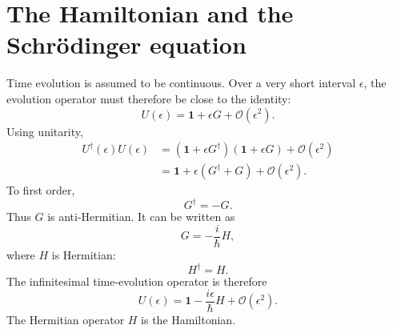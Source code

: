 \begin{classroomqa}
\end{classroomqa}

\section{The Hamiltonian and the Schr\"odinger equation}

Time evolution is assumed to be continuous. Over a very short interval \(\epsilon\), the evolution operator must therefore be close to the identity:
\begin{equation}
U(\epsilon)=\mathbf 1+\epsilon G+\mathcal O(\epsilon^2).
\end{equation}
Using unitarity,
\begin{align}
U^\dagger(\epsilon)U(\epsilon)
&=
\left(\mathbf 1+\epsilon G^\dagger\right)
\left(\mathbf 1+\epsilon G\right)
+\mathcal O(\epsilon^2)
\\
&=
\mathbf 1+\epsilon(G^\dagger+G)
+\mathcal O(\epsilon^2).
\end{align}
To first order,
\begin{equation}
G^\dagger=-G.
\end{equation}
Thus \(G\) is anti-Hermitian. It can be written as
\begin{equation}
G=-\frac{i}{\hbar}H,
\end{equation}
where \(H\) is Hermitian:
\begin{equation}
H^\dagger=H.
\end{equation}
The infinitesimal time-evolution operator is therefore
\begin{equation}
U(\epsilon)
=
\mathbf 1-\frac{i\epsilon}{\hbar}H
+\mathcal O(\epsilon^2).
\end{equation}
The Hermitian operator \(H\) is the Hamiltonian.

\begin{classroomqa}
\end{classroomqa}

